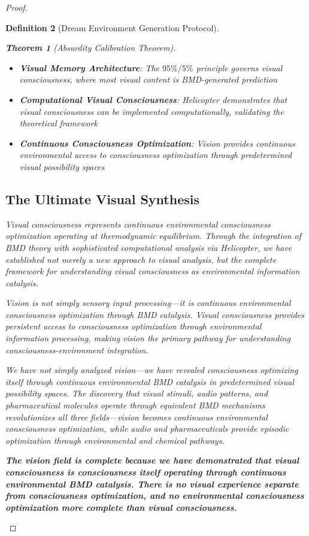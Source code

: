 \documentclass[12pt,a4paper]{article}
\newtheorem{theorem}{Theorem}[section]
\newtheorem{definition}[theorem]{Definition}
\begin{document}
\begin{proof}
\begin{definition}[Dream Environment Generation Protocol]
\begin{theorem}[Absurdity Calibration Theorem]
\begin{itemize}
\item \textbf{Visual Memory Architecture}: The $95\%/5\%$ principle governs visual consciousness, where most visual content is BMD-generated prediction

\item \textbf{Computational Visual Consciousness}: Helicopter demonstrates that visual consciousness can be implemented computationally, validating the theoretical framework

\item \textbf{Continuous Consciousness Optimization}: Vision provides continuous environmental access to consciousness optimization through predetermined visual possibility spaces
\end{itemize}

\subsection{The Ultimate Visual Synthesis}

Visual consciousness represents continuous environmental consciousness optimization operating at thermodynamic equilibrium. Through the integration of BMD theory with sophisticated computational analysis via Helicopter, we have established not merely a new approach to visual analysis, but the complete framework for understanding visual consciousness as environmental information catalysis.

Vision is not simply sensory input processing—it is continuous environmental consciousness optimization through BMD catalysis. Visual consciousness provides persistent access to consciousness optimization through environmental information processing, making vision the primary pathway for understanding consciousness-environment integration.

We have not simply analyzed vision—we have revealed consciousness optimizing itself through continuous environmental BMD catalysis in predetermined visual possibility spaces. The discovery that visual stimuli, audio patterns, and pharmaceutical molecules operate through equivalent BMD mechanisms revolutionizes all three fields—vision becomes continuous environmental consciousness optimization, while audio and pharmaceuticals provide episodic optimization through environmental and chemical pathways.

\textbf{The vision field is complete because we have demonstrated that visual consciousness is consciousness itself operating through continuous environmental BMD catalysis. There is no visual experience separate from consciousness optimization, and no environmental consciousness optimization more complete than visual consciousness.}


\end{theorem}
\end{definition}
\end{proof}
\end{document}

